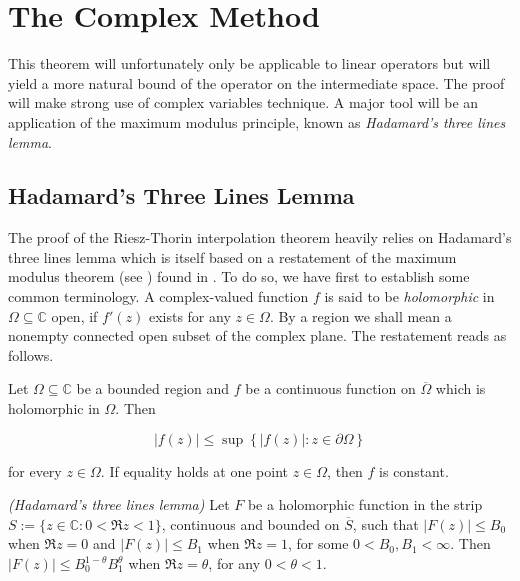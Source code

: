 \section{The Complex Method}
This theorem will unfortunately only be applicable to linear operators but will yield a more natural bound of the operator on the intermediate space. The proof will make strong use of complex variables technique. A major tool will be an application of the maximum modulus principle, known as \emph{Hadamard's three lines lemma}.

\subsection{Hadamard's Three Lines Lemma}
The proof of the Riesz-Thorin interpolation theorem heavily relies on Hadamard's three lines lemma which is itself based on a restatement of the maximum modulus theorem (see \cite[212]{rudin:rc_analysis:1987}) found in \cite[253]{rudin:rc_analysis:1987}. To do so, we have first to establish some common terminology. A complex-valued function $f$ is said to be \emph{holomorphic} in $\Omega \subseteq \mathbb{C}$ open, if $f'(z)$ exists for any $z \in \Omega$. By a region we shall mean a nonempty connected open subset of the complex plane. The restatement reads as follows.

\begin{theorem*}
	Let $\Omega \subseteq \mathbb{C}$ be a bounded region and $f$ be a continuous function on $\overline{\Omega}$ which is holomorphic in $\Omega$. Then 

	\begin{equation*}
		\left| f(z)\right| \leq \sup\left\{ \left|f(z) \right| : z \in \partial\Omega\right\}
	\end{equation*}

	\noindent for every $z \in \Omega$. If equality holds at one point $z \in \Omega$, then $f$ is constant.
\end{theorem*}

\begin{mdframed}
	\begin{lemma}\emph{(Hadamard's three lines lemma)}
		Let $F$ be a holomorphic function in the strip $S := \{z \in \mathbb{C}: 0 < \Re z < 1\}$, continuous and bounded on $\overline{S}$, such that $\left| F(z)\right| \leq B_0$ when $\Re z = 0$ and $\left| F(z) \right| \leq B_1$ when $\Re z = 1$, for some $0 < B_0,B_1 < \infty$. Then $\left| F(z) \right| \leq B_0^{1 - \theta}B_1^\theta$ when $\Re z = \theta$, for any $0 < \theta < 1$.
	\end{lemma}
\end{mdframed}

